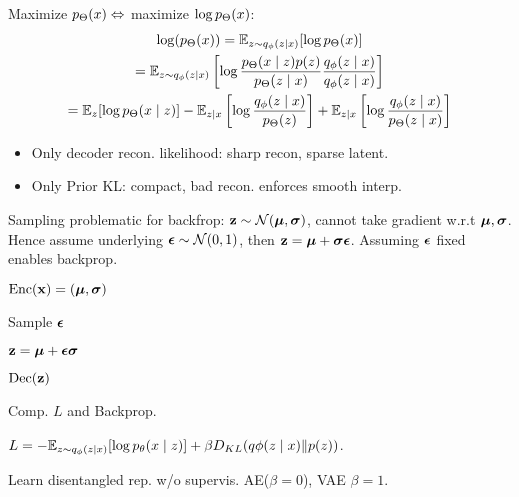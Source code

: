 \begin{definition}[Training]
    Maximize \(p_\Theta(x) \Leftrightarrow \) maximize \(\log p_\Theta(x)\):
    \begin{gather*}
        \log(p_\Theta(x)) = \mathbb{E}_{z \sim q_\phi(z \mid x)}[\log p_\Theta(x)] \\
        = \mathbb{E}_{z \sim q_\phi(z \mid x)}\left[\log \frac{p_\Theta(x \mid z) p(z)}{p_\Theta(z \mid x)} \frac{q_\phi(z \mid x)}{q_\phi(z \mid x)}\right] \\
        = \mathbb{E}_z[\log p_\Theta(x \mid z)] - \mathbb{E}_{z\mid x}\left[\log \frac{q_\phi(z \mid x)}{p_\Theta(z)}\right] + \mathbb{E}_{z \mid x}\left[\log\frac{q_\phi(z \mid x)}{p_\Theta(z \mid x)}\right]
    \end{gather*}
    \begin{itemize}
        \item Only decoder recon. likelihood: sharp recon, sparse latent.
        \item Only Prior KL: compact, bad recon. enforces smooth interp.
    \end{itemize}
\end{definition}

\begin{definition}[Reparameterization]
    Sampling problematic for backfrop: \(\vb{z} \sim \operatorname{\mathcal{N}}(\vb*{\mu}, \vb*{\sigma})\), cannot take gradient w.r.t \(\vb*{\mu}, \vb*{\sigma}\). Hence assume underlying \(\vb*{\epsilon} \sim \operatorname{\mathcal{N}}(0, 1)\), then \(\vb{z} = \vb*{\mu} + \vb*{\sigma}\vb*{\epsilon}\). Assuming \(\vb*{\epsilon}\) fixed enables backprop.
\end{definition}

\begin{definition}[Training]
    \begin{enumerate*}
        \item \(\text{Enc}(\vb{x}) = (\vb*{\mu}, \vb*{\sigma})\)
        \item Sample \(\vb*{\epsilon}\)
        \item \(\vb{z} = \vb*{\mu} + \vb*{\epsilon}\vb*{\sigma}\)
        \item \(\text{Dec}(\vb{z})\)
        \item Comp. \(L\) and Backprop.
    \end{enumerate*}
\end{definition}

\begin{definition}
    \(L = - \mathbb{E}_{z \sim q_\phi(z \mid x)}[\log p_\theta(x \mid z)] + \beta D_{KL}(q\phi(z \mid x)\Vert p(z))\).

    Learn disentangled rep. w/o supervis. AE(\(\beta = 0\)), VAE \(\beta = 1\).
\end{definition}

